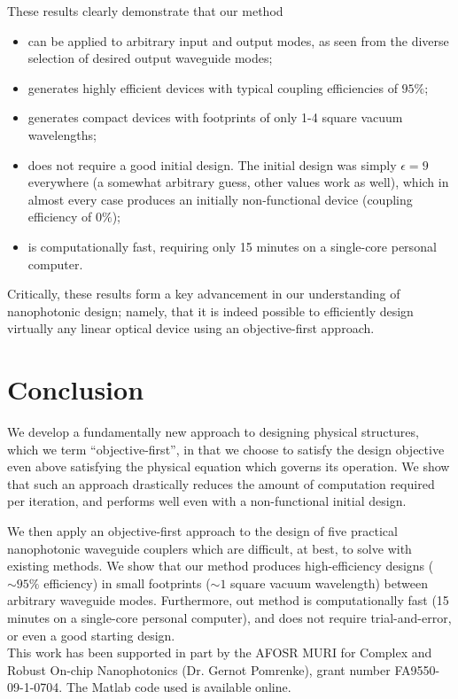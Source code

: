 \documentclass[letterpaper,10pt]{article}
\begin{document}
These results clearly demonstrate that our method
    \begin{itemize}
    \item can be applied to arbitrary input and output modes,
        as seen from the diverse selection of desired output waveguide modes;
    \item generates highly efficient devices with  
        typical coupling efficiencies of $95\%$;
    \item generates compact devices with footprints of only
        1-4 square vacuum wavelengths;
    \item does not require a good initial design.
        The initial design was simply $\epsilon = 9$ everywhere
            (a somewhat arbitrary guess, other values work as well),
            which in almost every case
            produces an initially non-functional device 
            (coupling efficiency of $0\%$);
    \item is computationally fast, 
        requiring only 15 minutes on a single-core personal computer.
    \end{itemize}

Critically, these results form a key advancement in our understanding of 
    nanophotonic design; namely, 
    that it is indeed possible to efficiently design
    virtually any linear optical device using an objective-first approach.

\section{Conclusion}
We develop a fundamentally new approach to designing physical structures,
    which we term ``objective-first'', 
    in that we choose to satisfy the design objective 
    even above satisfying the physical equation which governs its operation.
We show that such an approach drastically reduces the
    amount of computation required per iteration, and 
    performs well even with a non-functional initial design.

We then apply an objective-first approach to the design of 
    five practical nanophotonic waveguide couplers which are difficult, 
    at best, to solve with existing methods. 
We show that our method produces
    high-efficiency designs ($\sim 95\%$ efficiency) 
    in small footprints ($\sim 1$ square vacuum wavelength)
    between arbitrary waveguide modes.
Furthermore, out method
    is computationally fast (15 minutes on a single-core personal computer), and
    does not require trial-and-error, or even 
    a good starting design.\\

This work has been supported in part by the 
    AFOSR MURI for Complex and Robust On-chip Nanophotonics 
    (Dr. Gernot Pomrenke), grant number FA9550-09-1-0704.
The Matlab code used is available online\cite{code}.
\end{document}

